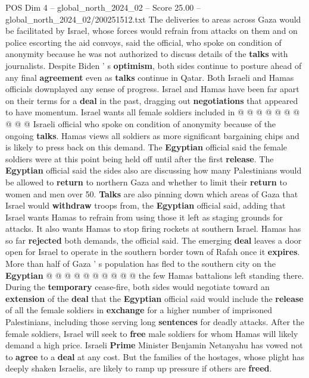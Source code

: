 \begin{textsample}{POS Dim 4 – global\_north\_2024\_02 – Score 25.00 – global\_north\_2024\_02/200251512.txt}
The deliveries to areas across Gaza would be facilitated by Israel, whose forces would refrain from attacks on them and on police escorting the aid convoys, said the official, who spoke on condition of anonymity because he was not authorized to discuss details of the \textbf{talks} with journalists.
Despite Biden ' s \textbf{optimism}, both sides continue to posture ahead of any final \textbf{agreement} even as \textbf{talks} continue in Qatar.
Both Israeli and Hamas officials downplayed any sense of progress.
Israel and Hamas have been far apart on their terms for a \textbf{deal} in the past, dragging out \textbf{negotiations} that appeared to have momentum.
Israel wants all female soldiers included in @ @ @ @ @ @ @ @ @ @ Israeli official who spoke on condition of anonymity because of the ongoing \textbf{talks}.
Hamas views all soldiers as more significant bargaining chips and is likely to press back on this demand.
The \textbf{Egyptian} official said the female soldiers were at this point being held off until after the first \textbf{release}.
The \textbf{Egyptian} official said the sides also are discussing how many Palestinians would be allowed to \textbf{return} to northern Gaza and whether to limit their \textbf{return} to women and men over 50. \textbf{Talks} are also pinning down which areas of Gaza that Israel would \textbf{withdraw} troops from, the \textbf{Egyptian} official said, adding that Israel wants Hamas to refrain from using those it left as staging grounds for attacks.
It also wants Hamas to stop firing rockets at southern Israel.
Hamas has so far \textbf{rejected} both demands, the official said.
The emerging \textbf{deal} leaves a door open for Israel to operate in the southern border town of Rafah once it \textbf{expires}.
More than half of Gaza ' s population has fled to the southern city on the \textbf{Egyptian} @ @ @ @ @ @ @ @ @ @ the few Hamas battalions left standing there.
During the \textbf{temporary} cease-fire, both sides would negotiate toward an \textbf{extension} of the \textbf{deal} that the \textbf{Egyptian} official said would include the \textbf{release} of all the female soldiers in \textbf{exchange} for a higher number of imprisoned Palestinians, including those serving long \textbf{sentences} for deadly attacks.
After the female soldiers, Israel will seek to \textbf{free} male soldiers for whom Hamas will likely demand a high price.
Israeli \textbf{Prime} Minister Benjamin Netanyahu has vowed not to \textbf{agree} to a \textbf{deal} at any cost.
But the families of the hostages, whose plight has deeply shaken Israelis, are likely to ramp up pressure if others are \textbf{freed}.

\end{textsample}
